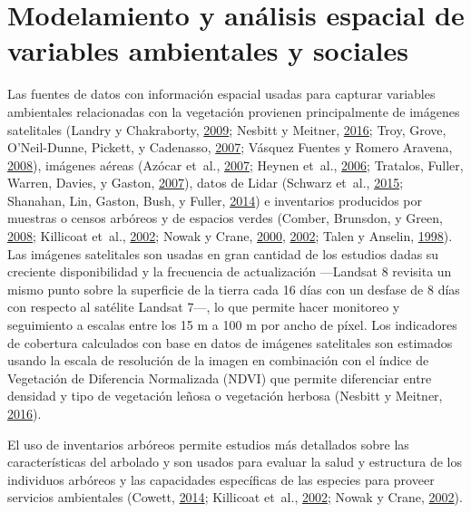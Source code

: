 \documentclass[12pt,a4paper,openany]{book}
\theoremstyle{definition}
\theoremstyle{definition}
\theoremstyle{definition}
\theoremstyle{remark}
\begin{document}
\section{Modelamiento y análisis espacial de variables ambientales y
sociales}\label{modelamiento-y-anuxe1lisis-espacial-de-variables-ambientales-y-sociales}

Las fuentes de datos con información espacial usadas para capturar
variables ambientales relacionadas con la vegetación provienen
principalmente de imágenes satelitales (Landry y Chakraborty,
\protect\hyperlink{ref-landry_street_2009}{2009}; Nesbitt y Meitner,
\protect\hyperlink{ref-nesbitt_exploring_2016}{2016}; Troy, Grove,
O'Neil-Dunne, Pickett, y Cadenasso,
\protect\hyperlink{ref-troy_predicting_2007}{2007}; Vásquez Fuentes y
Romero Aravena,
\protect\hyperlink{ref-vasquez_fuentes_vegetacion_2008}{2008}), imágenes
aéreas (Azócar et~al.,
\protect\hyperlink{ref-azocar_urbanization_2007}{2007}; Heynen et~al.,
\protect\hyperlink{ref-heynen_political_2006}{2006}; Tratalos, Fuller,
Warren, Davies, y Gaston,
\protect\hyperlink{ref-tratalos_urban_2007}{2007}), datos de Lidar
(Schwarz et~al., \protect\hyperlink{ref-schwarz_trees_2015}{2015};
Shanahan, Lin, Gaston, Bush, y Fuller,
\protect\hyperlink{ref-shanahan_socio-economic_2014}{2014}) e
inventarios producidos por muestras o censos arbóreos y de espacios
verdes (Comber, Brunsdon, y Green,
\protect\hyperlink{ref-comber_using_2008}{2008}; Killicoat et~al.,
\protect\hyperlink{ref-killicoat_economic_2002}{2002}; Nowak y Crane,
\protect\hyperlink{ref-nowak_urban_2000}{2000},
\protect\hyperlink{ref-nowak_carbon_2002}{2002}; Talen y Anselin,
\protect\hyperlink{ref-talen_assessing_1998}{1998}). Las imágenes
satelitales son usadas en gran cantidad de los estudios dadas su
creciente disponibilidad y la frecuencia de actualización ---Landsat 8
revisita un mismo punto sobre la superficie de la tierra cada 16 días
con un desfase de 8 días con respecto al satélite Landsat 7---, lo que
permite hacer monitoreo y seguimiento a escalas entre los 15 m a 100 m
por ancho de píxel. Los indicadores de cobertura calculados con base en
datos de imágenes satelitales son estimados usando la escala de
resolución de la imagen en combinación con el índice de Vegetación de
Diferencia Normalizada (NDVI) que permite diferenciar entre densidad y
tipo de vegetación leñosa o vegetación herbosa (Nesbitt y Meitner,
\protect\hyperlink{ref-nesbitt_exploring_2016}{2016}).

El uso de inventarios arbóreos permite estudios más detallados sobre las
características del arbolado y son usados para evaluar la salud y
estructura de los individuos arbóreos y las capacidades específicas de
las especies para proveer servicios ambientales (Cowett,
\protect\hyperlink{ref-cowett_methodology_2014}{2014}; Killicoat et~al.,
\protect\hyperlink{ref-killicoat_economic_2002}{2002}; Nowak y Crane,
\protect\hyperlink{ref-nowak_carbon_2002}{2002}).
\end{document}
